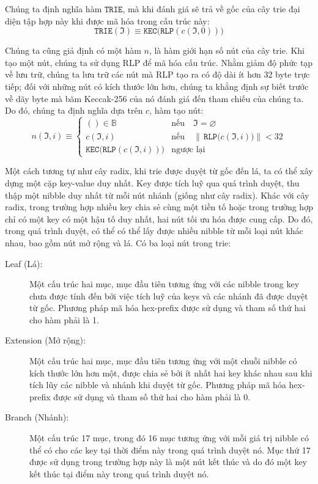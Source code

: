 \documentclass[9pt,oneside]{amsart}
\begin{document}
Chúng ta định nghĩa hàm $\texttt{TRIE}$, mà khi đánh giá sẽ trả về gốc của cây trie đại diện tập hợp này khi được mã hóa trong cấu trúc này:
\begin{equation}
\texttt{TRIE}(\mathfrak{I}) \equiv \texttt{KEC}\big(\texttt{RLP} (c(\mathfrak{I}, 0))\big)
\end{equation}

Chúng ta cũng giả định có một hàm $n$, là hàm giới hạn số nút của cây trie. Khi tạo một nút, chúng ta sử dụng RLP để mã hóa cấu trúc. Nhằm giảm độ phức tạp về lưu trữ, chúng ta lưu trữ các nút mà RLP tạo ra có độ dài ít hơn 32 byte trực tiếp; đối với những nút có kích thước lớn hơn, chúng ta khẳng định sự biết trước về dãy byte mà băm Keccak-256 của nó đánh giá đến tham chiếu của chúng ta. Do đó, chúng ta định nghĩa dựa trên $c$, hàm tạo nút:
\begin{equation}
n(\mathfrak{I}, i) \equiv \begin{cases}
() \in \mathbb{B} & \text{nếu} \quad \mathfrak{I} = \varnothing \\
c(\mathfrak{I}, i) & \text{nếu} \quad \lVert \, \texttt{RLP} \big( c(\mathfrak{I}, i) \big) \rVert < 32 \\
\texttt{KEC}\big(\texttt{RLP}( c(\mathfrak{I}, i)) \big) & \text{ngược lại}
\end{cases}
\end{equation}

Một cách tương tự như cây radix, khi trie được duyệt từ gốc đến lá, ta có thể xây dựng một cặp key-value duy nhất. Key được tích luỹ qua quá trình duyệt, thu thập một nibble duy nhất từ mỗi nút nhánh (giống như cây radix). Khác với cây radix, trong trường hợp nhiều key chia sẻ cùng một tiền tố hoặc trong trường hợp chỉ có một key có một hậu tố duy nhất, hai nút tối ưu hóa được cung cấp. Do đó, trong quá trình duyệt, có thể có thể lấy được nhiều nibble từ mỗi loại nút khác nhau, bao gồm nút mở rộng và lá. Có ba loại nút trong trie:

\begin{description}
\item[Leaf (Lá):] Một cấu trúc hai mục, mục đầu tiên tương ứng với các nibble trong key chưa được tính đến bởi việc tích luỹ của keys và các nhánh đã được duyệt từ gốc. Phương pháp mã hóa hex-prefix được sử dụng và tham số thứ hai cho hàm phải là 1.

\item[Extension (Mở rộng):] Một cấu trúc hai mục, mục đầu tiên tương ứng với một chuỗi nibble có kích thước lớn hơn một, được chia sẻ bởi ít nhất hai key khác nhau sau khi tích lũy các nibble và nhánh khi duyệt từ gốc. Phương pháp mã hóa hex-prefix được sử dụng và tham số thứ hai cho hàm phải là 0.

\item[Branch (Nhánh):] Một cấu trúc 17 mục, trong đó 16 mục tương ứng với mỗi giá trị nibble có thể có cho các key tại thời điểm này trong quá trình duyệt nó. Mục thứ 17 được sử dụng trong trường hợp này là một nút kết thúc và do đó một key kết thúc tại điểm này trong quá trình duyệt nó.
\end{description}
\end{document}
